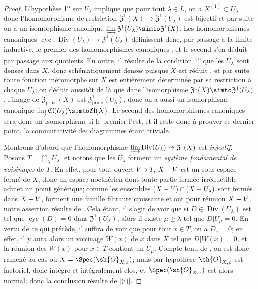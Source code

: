 \begin{proof}
L'hypothèse 1\textsuperscript{o} sur $U_\lambda$ implique que pour tout $\lambda\in L$, on a $X^{(1)}\subset U_\lambda$  donc l'homomorphisme de restriction $\mathfrak{Z}^1(X)\to\mathfrak{Z}^1(U_\lambda)$ est bijectif et par suite on a un isomorphisme canonique $\varinjlim\mathfrak{Z}^1(U_\lambda)\simto\mathfrak{Z}^1(X)$.
Les homomorphismes canoniques $\operatorname{cyc}:\operatorname{Div}(U_\lambda)\to\mathfrak{Z}^1(U_\lambda)$ définissent donc, par passage à la limite inductive, le premier des homomorphismes canoniques , et le second s'en déduit par passage aux quotients.
En outre, il résulte de la condition 1\textsuperscript{o} que les $U_\lambda$ sont denses dans $X$, donc schématiquement denses puisque $X$ est réduit , et par suite toute fonction méromorphe sur $X$ est entièrement déterminée par sa restriction à chaque $U_\lambda$;
on déduit aussitôt de là que dans l'isomorphisme $\mathfrak{Z}^1(X)\simto\mathfrak{Z}^1(U_\lambda)$, l'image de $\mathfrak{Z}^1_\mathrm{princ}(X)$ est $\mathfrak{Z}^1_\mathrm{princ}(U_\lambda)$, donc on a aussi un isomorphisme canonique $\varinjlim\mathfrak{Cl}(U_\lambda)\simto\mathfrak{Cl}(X)$.
Le second des homomorphismes canoniques  sera donc un isomorphisme si le premier l'est, et il reste donc à prouver ce dernier point, la commutativité des diagrammes  étant triviale.

Montrons d'abord que l'homomorphisme $\varinjlim\operatorname{Div}(U_\lambda)\to\mathfrak{Z}^1(X)$ est \emph{injectif}.
Posons $T=\bigcap_\lambda U_\lambda$, et notons que les $U_\lambda$ forment un \emph{système fondamental de voisinages} de $T$.
En effet, pour tout ouvert $V\supset T$, $X- V$ est un sous-espace fermé de $X$, donc un espace noethérien dont toute partie fermée irréductible admet un point générique;
comme les ensembles $(X- V)\cap(X- U_\lambda)$ sont fermés dans $X- V$, forment une famille filtrante croissante et ont pour réunion $X- V$, notre assertion résulte de .
Cela étant, il s'agit de voir que si $D\in\operatorname{Div}(U_\lambda)$ est tel que $\operatorname{cyc}(D)=0$ dans $\mathfrak{Z}^1(U_\lambda)$, alors il existe $\mu\geq\lambda$ tel que $D|U_\mu=0$.
En vertu de ce qui précède, il suffira de voir que pour tout $x\in T$, on a $D_x=0$;
en effet, il y aura alors un voisinage $W(x)$ de $x$ dans $X$ tel que $D|W(x)=0$, et la réunion des $W(x)$ pour $x\in T$ contient un $U_\mu$.
Compte tenu de , on est donc ramené au cas où $X=\Spec(\sh{O}_{X,x})$;
mais par hypothèse $\sh{O}_{X,x}$ est factoriel, donc intègre et intégralement clos, et $\Spec(\sh{O}_{X,x})$ est alors normal;
donc la conclusion résulte de [(i)].


\end{proof}
